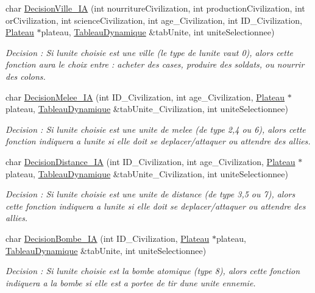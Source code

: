 \begin{DoxyCompactItemize}
char \hyperlink{classIA_a552359a980947191eb5be6a6723aef06}{Decision\+Ville\+\_\+\+IA} (int nourriture\+Civilization, int production\+Civilization, int or\+Civilization, int science\+Civilization, int age\+\_\+\+Civilization, int I\+D\+\_\+\+Civilization, \hyperlink{classPlateau}{Plateau} $\ast$plateau, \hyperlink{classTableauDynamique}{Tableau\+Dynamique} \&tab\+Unite, int unite\+Selectionnee)
\begin{DoxyCompactList}\small\item\em Decision \+: Si l\textquotesingle{}unite choisie est une ville (le type de l\textquotesingle{}unite vaut 0), alors cette fonction aura le choix entre \+: acheter des cases, produire des soldats, ou nourrir des colons. \end{DoxyCompactList}\item 
char \hyperlink{classIA_a0e9087a9086cbbcd1242380855c2db5e}{Decision\+Melee\+\_\+\+IA} (int I\+D\+\_\+\+Civilization, int age\+\_\+\+Civilization, \hyperlink{classPlateau}{Plateau} $\ast$plateau, \hyperlink{classTableauDynamique}{Tableau\+Dynamique} \&tab\+Unite\+\_\+\+Civilization, int unite\+Selectionnee)
\begin{DoxyCompactList}\small\item\em Decision \+: Si l\textquotesingle{}unite choisie est une unite de melee (de type 2,4 ou 6), alors cette fonction indiquera a l\textquotesingle{}unite si elle doit se deplacer/attaquer ou attendre des allies. \end{DoxyCompactList}\item 
char \hyperlink{classIA_a188b58fc1159684a952e21e45e4622c4}{Decision\+Distance\+\_\+\+IA} (int I\+D\+\_\+\+Civilization, int age\+\_\+\+Civilization, \hyperlink{classPlateau}{Plateau} $\ast$plateau, \hyperlink{classTableauDynamique}{Tableau\+Dynamique} \&tab\+Unite\+\_\+\+Civilization, int unite\+Selectionnee)
\begin{DoxyCompactList}\small\item\em Decision \+: Si l\textquotesingle{}unite choisie est une unite de distance (de type 3,5 ou 7), alors cette fonction indiquera a l\textquotesingle{}unite si elle doit se deplacer/attaquer ou attendre des allies. \end{DoxyCompactList}\item 
char \hyperlink{classIA_ae12dec33731a54b1f48ad39413e23524}{Decision\+Bombe\+\_\+\+IA} (int I\+D\+\_\+\+Civilization, \hyperlink{classPlateau}{Plateau} $\ast$plateau, \hyperlink{classTableauDynamique}{Tableau\+Dynamique} \&tab\+Unite, int unite\+Selectionnee)
\begin{DoxyCompactList}\small\item\em Decision \+: Si l\textquotesingle{}unite choisie est la bombe atomique (type 8), alors cette fonction indiquera a la bombe si elle est a portee de tir d\textquotesingle{}une unite ennemie. \end{DoxyCompactList}\item 

\end{DoxyCompactItemize}
